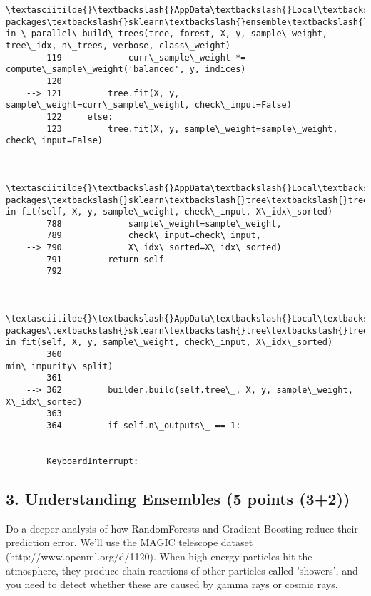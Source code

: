 \documentclass[11pt]{article}
\begin{document}
\begin{Verbatim}[commandchars=\\\{\}]
        \textasciitilde{}\textbackslash{}AppData\textbackslash{}Local\textbackslash{}Continuum\textbackslash{}anaconda3\textbackslash{}lib\textbackslash{}site-packages\textbackslash{}sklearn\textbackslash{}ensemble\textbackslash{}forest.py in \_parallel\_build\_trees(tree, forest, X, y, sample\_weight, tree\_idx, n\_trees, verbose, class\_weight)
        119             curr\_sample\_weight *= compute\_sample\_weight('balanced', y, indices)
        120 
    --> 121         tree.fit(X, y, sample\_weight=curr\_sample\_weight, check\_input=False)
        122     else:
        123         tree.fit(X, y, sample\_weight=sample\_weight, check\_input=False)
    

        \textasciitilde{}\textbackslash{}AppData\textbackslash{}Local\textbackslash{}Continuum\textbackslash{}anaconda3\textbackslash{}lib\textbackslash{}site-packages\textbackslash{}sklearn\textbackslash{}tree\textbackslash{}tree.py in fit(self, X, y, sample\_weight, check\_input, X\_idx\_sorted)
        788             sample\_weight=sample\_weight,
        789             check\_input=check\_input,
    --> 790             X\_idx\_sorted=X\_idx\_sorted)
        791         return self
        792 
    

        \textasciitilde{}\textbackslash{}AppData\textbackslash{}Local\textbackslash{}Continuum\textbackslash{}anaconda3\textbackslash{}lib\textbackslash{}site-packages\textbackslash{}sklearn\textbackslash{}tree\textbackslash{}tree.py in fit(self, X, y, sample\_weight, check\_input, X\_idx\_sorted)
        360                                            min\_impurity\_split)
        361 
    --> 362         builder.build(self.tree\_, X, y, sample\_weight, X\_idx\_sorted)
        363 
        364         if self.n\_outputs\_ == 1:
    

        KeyboardInterrupt: 

    \end{Verbatim}

    \subsection{3. Understanding Ensembles (5 points
(3+2))}\label{understanding-ensembles-5-points-32}

Do a deeper analysis of how RandomForests and Gradient Boosting reduce
their prediction error. We'll use the MAGIC telescope dataset
(http://www.openml.org/d/1120). When high-energy particles hit the
atmosphere, they produce chain reactions of other particles called
'showers', and you need to detect whether these are caused by gamma rays
or cosmic rays.
\end{document}
